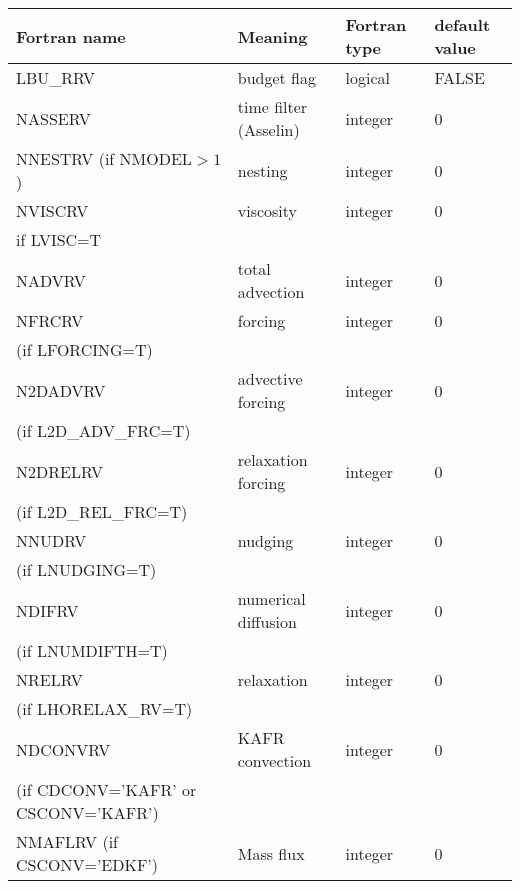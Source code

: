 \begin{longtable} {|p{}|p{}|>{\centering}p{}|p{}<{\centering}|}
\hline
Fortran name & Meaning & Fortran type & default value \\
\hline \hline
\endhead
LBU\_RRV & budget flag & logical & FALSE\index{LBU\_RRV!\innam{NAM\_BU\_RRV}} \\\hline
NASSERV  & time filter (Asselin)   & integer  &  0 \index{NASSERV!\innam{NAM\_BU\_RRV}} \\\hline
NNESTRV (if NMODEL$>1$) & nesting           & integer  &  0 \index{NNESTRV!\innam{NAM\_BU\_RRV}} \\\hline
NVISCRV  & viscosity         & integer  &  0 \index{NVISCRV!\innam{NAM\_BU\_RRV}}\\
if LVISC=T &  &   &   \\\hline
NADVRV   & total advection   & integer  &  0 \index{NADVRV!\innam{NAM\_BU\_RRV}}\\\hline
NFRCRV   & forcing           & integer  &  0 \index{NFRCRV!\innam{NAM\_BU\_RRV}} \\ \nopagebreak
(if LFORCING=T) &  &   &   \\\hline
N2DADVRV   &advective forcing           & integer  &  0 \index{N2DADVRV!\innam{NAM\_BU\_RRV}} \\ \nopagebreak
(if L2D\_ADV\_FRC=T) &  &   &   \\\hline
N2DRELRV   & relaxation forcing           & integer  &  0 \index{N2DRLERV!\innam{NAM\_BU\_RRV}} \\ \nopagebreak
(if L2D\_REL\_FRC=T) &  &   &   \\\hline
NNUDRV   & nudging           & integer  &  0 \index{NNUDRV!\innam{NAM\_BU\_RRV}} \\ \nopagebreak
(if LNUDGING=T) &  &   &   \\\hline
NDIFRV   & numerical diffusion & integer  &  0 \index{NDIFRV!\innam{NAM\_BU\_RRV}}\\ \nopagebreak
(if LNUMDIFTH=T) &  &   &   \\\hline
NRELRV   & relaxation        & integer  &  0 \index{NRELRV!\innam{NAM\_BU\_RRV}}\\ \nopagebreak
(if LHORELAX\_RV=T) &  &   &   \\\hline
NDCONVRV  & KAFR convection   & integer  &  0 \index{NDCONVRV!\innam{NAM\_BU\_RRV}}\\ \nopagebreak
(if CDCONV='KAFR' or CSCONV='KAFR') &  &   &   \\\hline
NMAFLRV (if CSCONV='EDKF') & Mass flux & integer  &  0 \index{NMAFLRV!\innam{NAM\_BU\_RRV}} \\\hline

\end{longtable}
